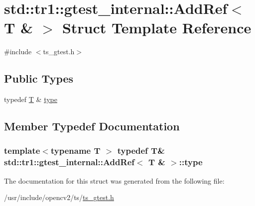 \hypertarget{structstd_1_1tr1_1_1gtest__internal_1_1AddRef_3_01T_01_6_01_4}{\section{std\-:\-:tr1\-:\-:gtest\-\_\-internal\-:\-:Add\-Ref$<$ T \& $>$ Struct Template Reference}
\label{structstd_1_1tr1_1_1gtest__internal_1_1AddRef_3_01T_01_6_01_4}
}


{\ttfamily \#include $<$ts\-\_\-gtest.\-h$>$}

\subsection*{Public Types}
\begin{DoxyCompactItemize}
\item 
typedef \hyperlink{calib3d_8hpp_a3efb9551a871ddd0463079a808916717}{T} \& \hyperlink{structstd_1_1tr1_1_1gtest__internal_1_1AddRef_3_01T_01_6_01_4_a9cb3b0992c2a9e7df42d01fb64c2dc88}{type}
\end{DoxyCompactItemize}


\subsection{Member Typedef Documentation}
\hypertarget{structstd_1_1tr1_1_1gtest__internal_1_1AddRef_3_01T_01_6_01_4_a9cb3b0992c2a9e7df42d01fb64c2dc88}{
\subsubsection[{type}]{\setlength{\rightskip}{0pt plus 5cm}template$<$typename T $>$ typedef {\bf T}\& {\bf std\-::tr1\-::gtest\-\_\-internal\-::\-Add\-Ref}$<$ {\bf T} \& $>$\-::{\bf type}}}\label{structstd_1_1tr1_1_1gtest__internal_1_1AddRef_3_01T_01_6_01_4_a9cb3b0992c2a9e7df42d01fb64c2dc88}


The documentation for this struct was generated from the following file\-:\begin{DoxyCompactItemize}
\item 
/usr/include/opencv2/ts/\hyperlink{ts__gtest_8h}{ts\-\_\-gtest.\-h}\end{DoxyCompactItemize}
